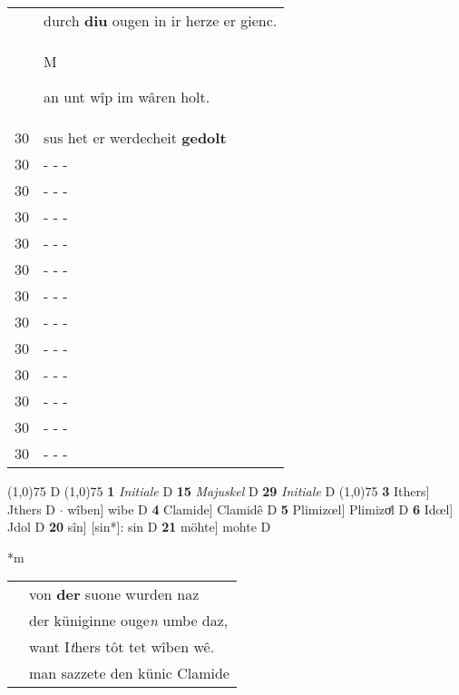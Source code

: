 \documentclass[8pt,a4paper,notitlepage]{article}
\begin{document}
\begin{table}[ht]
\begin{minipage}[t]{0.5\linewidth}
\begin{tabular}{rl}
 & durch \textbf{diu} ougen in ir herze er gienc.\\ 
 & \begin{large}M\end{large}an unt wîp im wâren holt.\\ 
30 & sus het er werdecheit \textbf{gedolt}\\ 
30 & \multicolumn{1}{l}{ - - - }\\ 
30 & \multicolumn{1}{l}{ - - - }\\ 
30 & \multicolumn{1}{l}{ - - - }\\ 
30 & \multicolumn{1}{l}{ - - - }\\ 
30 & \multicolumn{1}{l}{ - - - }\\ 
30 & \multicolumn{1}{l}{ - - - }\\ 
30 & \multicolumn{1}{l}{ - - - }\\ 
30 & \multicolumn{1}{l}{ - - - }\\ 
30 & \multicolumn{1}{l}{ - - - }\\ 
30 & \multicolumn{1}{l}{ - - - }\\ 
30 & \multicolumn{1}{l}{ - - - }\\ 
30 & \multicolumn{1}{l}{ - - - }\\ 
\end{tabular}
\scriptsize
\line(1,0){75} \newline
D \newline
\line(1,0){75} \newline
\textbf{1} \textit{Initiale} D  \textbf{15} \textit{Majuskel} D  \textbf{29} \textit{Initiale} D  \newline
\line(1,0){75} \newline
\textbf{3} Ithers] Jthers D  $\cdot$ wîben] wibe D \textbf{4} Clamide] Clamidê D \textbf{5} Plimizœl] Plimizoͤl D \textbf{6} Idœl] Jdol D \textbf{20} sîn] [sin*]: sin D \textbf{21} möhte] mohte D \newline
\end{minipage}
\hspace{0.5cm}
\begin{minipage}[t]{0.5\linewidth}
\small
\begin{center}*m
\end{center}
\begin{tabular}{rl}
 & von \textbf{der} suone wurden naz\\ 
 & der küniginne ouge\textit{n} umbe daz,\\ 
 & want I\textit{t}hers tôt tet wîben wê.\\ 
 & man sazzete den künic Clamide\\ 

\end{tabular}
\end{minipage}
\end{table}
\end{document}
